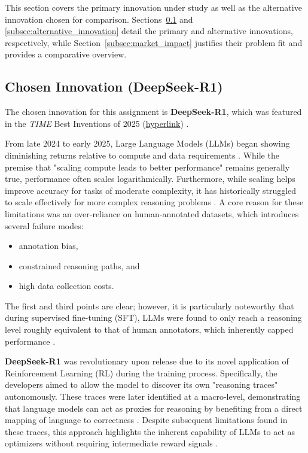 \documentclass{article}
\begin{document}
This section covers the primary innovation under study as well as the alternative innovation chosen for comparison. Sections~\ref{subsec:chosen_innovation} and \ref{subsec:alternative_innovation} detail the primary and alternative innovations, respectively, while Section~\ref{subsec:market_impact} justifies their problem fit and provides a comparative overview.

\subsection{Chosen Innovation (DeepSeek-R1)}
\label{subsec:chosen_innovation}
The chosen innovation for this assignment is \textbf{DeepSeek-R1}, which was featured in the \textit{TIME} Best Inventions of 2025 (\href{https://time.com/collections/best-inventions-2025/7318246/deepseek-r1/}{hyperlink}) \cite{time2025deepseekr1}.

From late 2024 to early 2025, Large Language Models (LLMs) began showing diminishing returns relative to compute and data requirements \cite{chen2025revisiting}. While the premise that "scaling compute leads to better performance" remains generally true, performance often scales logarithmically. Furthermore, while scaling helps improve accuracy for tasks of moderate complexity, it has historically struggled to scale effectively for more complex reasoning problems \cite{deepseekr1, aiindex2025}. A core reason for these limitations was an over-reliance on human-annotated datasets, which introduces several failure modes:
\begin{itemize}
    \item annotation bias,
    \item constrained reasoning paths, and
    \item high data collection costs.
\end{itemize}

The first and third points are clear; however, it is particularly noteworthy that during supervised fine-tuning (SFT), LLMs were found to only reach a reasoning level roughly equivalent to that of human annotators, which inherently capped performance \cite{deepseekr1}.

\textbf{DeepSeek-R1} was revolutionary upon release due to its novel application of Reinforcement Learning (RL) during the training process. Specifically, the developers aimed to allow the model to discover its own "reasoning traces" autonomously. These traces were later identified at a macro-level, demonstrating that language models can act as proxies for reasoning by benefiting from a direct mapping of language to correctness \cite{deepseekthoughtology}. Despite subsequent limitations found in these traces, this approach highlights the inherent capability of LLMs to act as optimizers without requiring intermediate reward signals \cite{yang2023llmoptimizers}.
\end{document}
